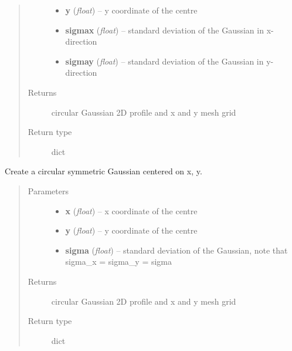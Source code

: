 \documentclass[a4paper,11pt,english]{sphinxmanual}
\begin{document}
\begin{fulllineitems}
\begin{fulllineitems}
\begin{quote}
\begin{description}
\begin{itemize}
\item {} 
\textbf{y} (\emph{float}) -- y coordinate of the centre

\item {} 
\textbf{sigmax} (\emph{float}) -- standard deviation of the Gaussian in x-direction

\item {} 
\textbf{sigmay} (\emph{float}) -- standard deviation of the Gaussian in y-direction

\end{itemize}

\item[{Returns}] \leavevmode
circular Gaussian 2D profile and x and y mesh grid

\item[{Return type}] \leavevmode
dict

\end{description}\end{quote}

\end{fulllineitems}


\begin{fulllineitems}
Create a circular symmetric Gaussian centered on x, y.
\begin{quote}\begin{description}
\item[{Parameters}] \leavevmode\begin{itemize}
\item {} 
\textbf{x} (\emph{float}) -- x coordinate of the centre

\item {} 
\textbf{y} (\emph{float}) -- y coordinate of the centre

\item {} 
\textbf{sigma} (\emph{float}) -- standard deviation of the Gaussian, note that sigma\_x = sigma\_y = sigma

\end{itemize}

\item[{Returns}] \leavevmode
circular Gaussian 2D profile and x and y mesh grid

\item[{Return type}] \leavevmode
dict

\end{description}\end{quote}


\end{fulllineitems}
\end{fulllineitems}
\end{document}
